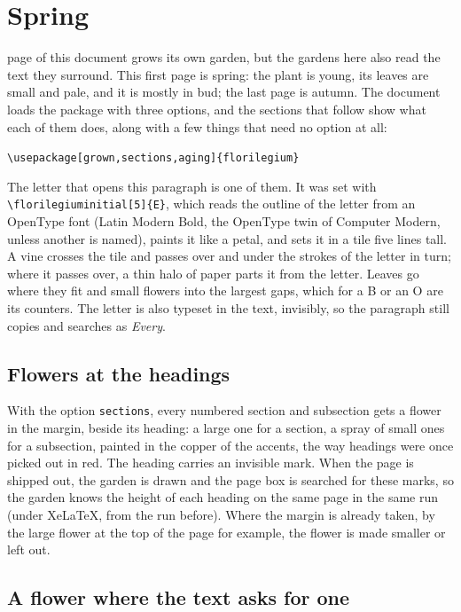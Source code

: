 \documentclass[11pt,a4paper]{article}
\newcommand\code[1]{\texttt{\small #1}}
\begin{document}
\section{Spring}

 page of this document grows its own garden, but the
gardens here also read the text they surround. This first page is spring: the plant is
young, its leaves are small and pale, and it is mostly in bud; the last page is autumn.
The document loads the package with three options, and the sections that follow show what
each of them does, along with a few things that need no option at all:
\begin{center}\code{\textbackslash usepackage[grown,sections,aging]\{florilegium\}}\end{center}

The letter that opens this paragraph is one of them. It was set with
\code{\textbackslash florilegiuminitial[5]\{E\}}, which reads the outline of the letter from an OpenType font (Latin
Modern Bold, the OpenType twin of Computer Modern, unless another is named), paints it
like a petal, and sets it in a tile five lines tall. A vine crosses the tile and passes
over and under the strokes of the letter in turn; where it passes over, a thin halo of
paper parts it from the letter. Leaves go where they fit and small flowers into the
largest gaps, which for a B or an O are its counters. The letter is also typeset in the
text, invisibly, so the paragraph still copies and searches as \emph{Every}.

\subsection{Flowers at the headings}

With the option \code{sections}, every numbered section and subsection gets a flower in the
margin, beside its heading: a large one for a section, a spray of small ones for a
subsection, painted in the copper of the accents, the way headings were once picked out in
red. The heading carries an invisible mark. When the page is shipped out, the
garden is drawn and the page box is searched for these marks, so the garden knows the
height of each heading on the same page in the same run (under Xe\LaTeX, from the run before). Where the margin is already
taken, by the large flower at the top of the page for example, the flower is made
smaller or left out.

\subsection{A flower where the text asks for one}
\end{document}
